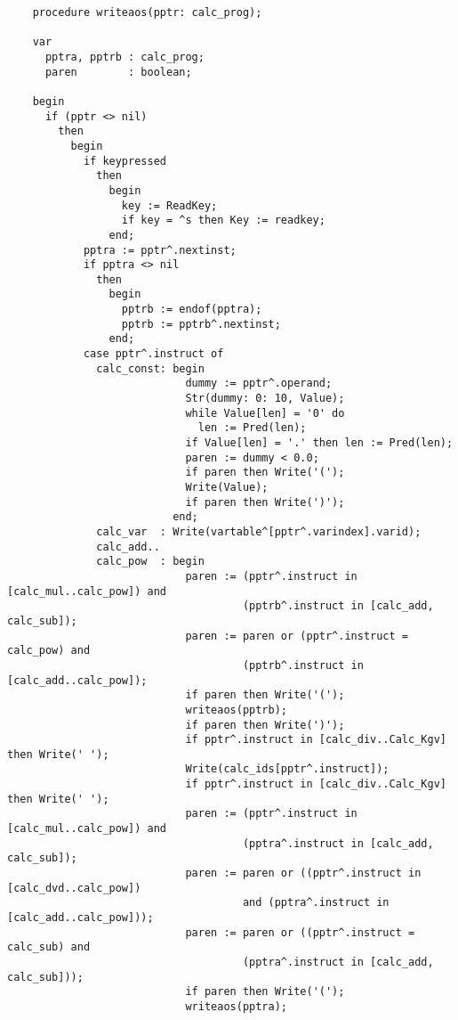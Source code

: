 \begin{refsection}
\begin{lstlisting}
    procedure writeaos(pptr: calc_prog);

    var
      pptra, pptrb : calc_prog;
      paren        : boolean;

    begin
      if (pptr <> nil)
        then
          begin
            if keypressed
              then
                begin
                  key := ReadKey;
                  if key = ^s then Key := readkey;
                end;
            pptra := pptr^.nextinst;
            if pptra <> nil
              then
                begin
                  pptrb := endof(pptra);
                  pptrb := pptrb^.nextinst;
                end;
            case pptr^.instruct of
              calc_const: begin
                            dummy := pptr^.operand;
                            Str(dummy: 0: 10, Value);
                            while Value[len] = '0' do
                              len := Pred(len);
                            if Value[len] = '.' then len := Pred(len);
                            paren := dummy < 0.0;
                            if paren then Write('(');
                            Write(Value);
                            if paren then Write(')');
                          end;
              calc_var  : Write(vartable^[pptr^.varindex].varid);
              calc_add..
              calc_pow  : begin
                            paren := (pptr^.instruct in [calc_mul..calc_pow]) and
                                     (pptrb^.instruct in [calc_add, calc_sub]);
                            paren := paren or (pptr^.instruct = calc_pow) and
                                     (pptrb^.instruct in [calc_add..calc_pow]);
                            if paren then Write('(');
                            writeaos(pptrb);
                            if paren then Write(')');
                            if pptr^.instruct in [calc_div..Calc_Kgv] then Write(' ');
                            Write(calc_ids[pptr^.instruct]);
                            if pptr^.instruct in [calc_div..Calc_Kgv] then Write(' ');
                            paren := (pptr^.instruct in [calc_mul..calc_pow]) and
                                     (pptra^.instruct in [calc_add, calc_sub]);
                            paren := paren or ((pptr^.instruct in [calc_dvd..calc_pow])
                                     and (pptra^.instruct in [calc_add..calc_pow]));
                            paren := paren or ((pptr^.instruct = calc_sub) and
                                     (pptra^.instruct in [calc_add, calc_sub]));
                            if paren then Write('(');
                            writeaos(pptra);

\end{lstlisting}
\end{refsection}
